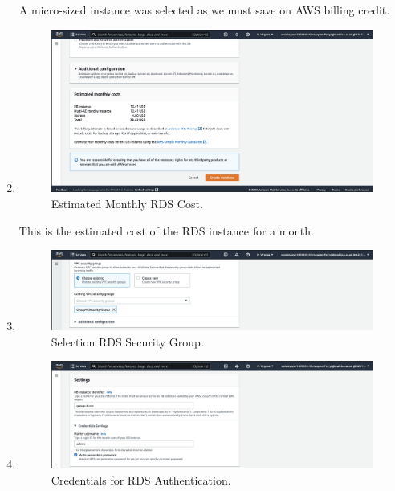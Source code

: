 \begin{enumerate}
    A micro-sized instance was selected as we must save on AWS billing credit.

    \item
    \begin{figure}[H]
        \centering
        \includegraphics[width=\textwidth]{resources/rds/rds-monthly-costs}
        \caption{Estimated Monthly RDS Cost.}
        \label{fig:rds-costs}
    \end{figure}

    This is the estimated cost of the RDS instance for a month.

    \item
    \begin{figure}[H]
        \centering
        \includegraphics[width=\textwidth]{resources/rds/rds-security-group}
        \caption{Selection RDS Security Group.}
        \label{fig:rds-security}
    \end{figure}

    \item
    \begin{figure}[H]
        \centering
        \includegraphics[width=\textwidth]{resources/rds/rds-settings}
        \caption{Credentials for RDS Authentication.}
        \label{fig:rds-settings}
    \end{figure}


\end{enumerate}
